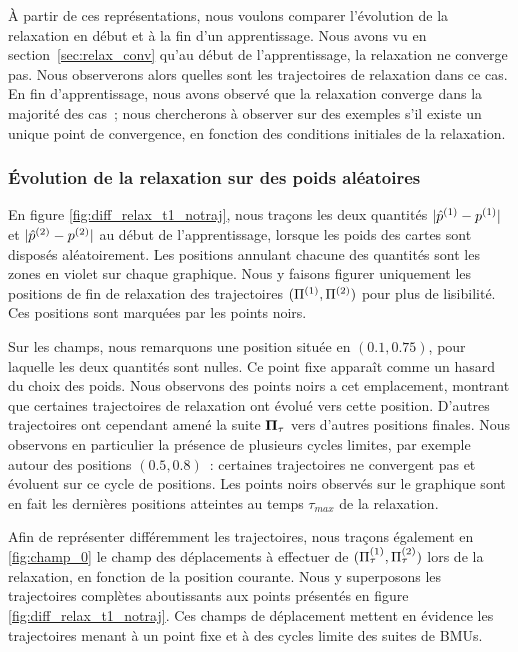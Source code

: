 \documentclass[../main]{subfiles}
\begin{document}
\`A partir de ces représentations, nous voulons comparer l'évolution de la relaxation en début et à la fin d'un apprentissage. 
Nous avons vu en section~\ref{sec:relax_conv} qu'au début de l'apprentissage, la relaxation ne converge pas. Nous observerons alors quelles sont les trajectoires de relaxation dans ce cas.
En fin d'apprentissage, nous avons observé que la relaxation converge dans la majorité des cas~; nous chercherons à observer sur des exemples s'il existe un unique point de convergence, en fonction des conditions initiales de la relaxation.

\subsubsection{\'Evolution de la relaxation sur des poids aléatoires}

En figure \ref{fig:diff_relax_t1_notraj}, nous traçons les deux quantités $\lvert \hat{p}^{({1})} - p^{({1})} \rvert$ et $\lvert \hat{p}^{({2})} - p^{({2})}\rvert$ au début de l'apprentissage, lorsque les poids des cartes sont disposés aléatoirement.
Les positions annulant chacune des quantités sont les zones en violet sur chaque graphique.
Nous y faisons figurer uniquement les positions de fin de relaxation des trajectoires $(\Pi^{({1})},\Pi^{({2})})$ pour plus de lisibilité. Ces positions sont marquées par les points noirs.

Sur les champs, nous remarquons une position située en $(0.1, 0.75)$, pour laquelle les deux quantités sont nulles. Ce point fixe apparaît comme un hasard du choix des poids.
Nous observons des points noirs a cet emplacement, montrant que certaines trajectoires de relaxation ont évolué vers cette position. 
D'autres trajectoires ont cependant amené la suite $\mathbf{\Pi}_\tau$ vers d'autres positions finales.
Nous observons en particulier la présence de plusieurs cycles limites, par exemple autour des positions $(0.5, 0.8)$~: certaines trajectoires ne convergent pas et évoluent sur ce cycle de positions. Les points noirs observés sur le graphique sont en fait les dernières positions atteintes au temps $\tau_{max}$ de la relaxation.

Afin de représenter différemment les trajectoires, nous traçons également en \ref{fig:champ_0} le champ des déplacements à effectuer de $(\Pi^{({1})}_\tau,\Pi^{({2})}_\tau)$ lors de la relaxation, en fonction de la position courante. 
Nous y superposons les trajectoires complètes aboutissants aux points présentés en figure \ref{fig:diff_relax_t1_notraj}.
Ces champs de déplacement mettent en évidence les trajectoires menant à un point fixe et à des cycles limite des suites de BMUs.
\end{document}
